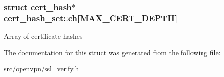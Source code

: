 \subsubsection[{ch}]{\setlength{\rightskip}{0pt plus 5cm}struct {\bf cert\+\_\+hash}$\ast$ cert\+\_\+hash\+\_\+set\+::ch\mbox{[}{\bf M\+A\+X\+\_\+\+C\+E\+R\+T\+\_\+\+D\+E\+P\+T\+H}\mbox{]}}\label{structcert__hash__set_a1d62c176153ce49841aea5c0aed607a2}
Array of certificate hashes 

The documentation for this struct was generated from the following file\+:\begin{DoxyCompactItemize}
\item 
src/openvpn/\hyperlink{ssl__verify_8h}{ssl\+\_\+verify.\+h}\end{DoxyCompactItemize}
